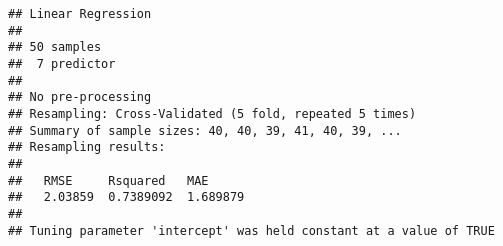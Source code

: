 \documentclass[
]{article}
\begin{document}
\begin{verbatim}
## Linear Regression 
## 
## 50 samples
##  7 predictor
## 
## No pre-processing
## Resampling: Cross-Validated (5 fold, repeated 5 times) 
## Summary of sample sizes: 40, 40, 39, 41, 40, 39, ... 
## Resampling results:
## 
##   RMSE     Rsquared   MAE     
##   2.03859  0.7389092  1.689879
## 
## Tuning parameter 'intercept' was held constant at a value of TRUE
\end{verbatim}
\end{document}
